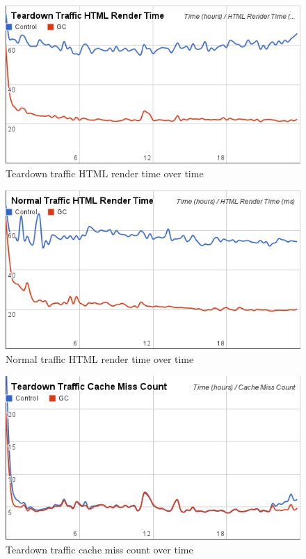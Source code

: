 \documentclass[12pt]{ucthesis}
\begin{document}
\begin{figure}[htp]
\centering
\includegraphics[width=\textwidth]{assets/teardownHTMLRenderTimeXTime.png}
\caption{Teardown traffic HTML render time over time}
\label{fig:teardownHTMLRenderTimeXTime}
\end{figure}

\begin{figure}[htp]
\centering
\includegraphics[width=\textwidth]{assets/normalHTMLRenderTimeXTime.png}
\caption{Normal traffic HTML render time over time}
\label{fig:normalHTMLRenderTimeXTime}
\end{figure}


\begin{figure}[htp]
\centering
\includegraphics[width=\textwidth]{assets/teardownMissCountXTime.png}
\caption{Teardown traffic cache miss count over time}
\label{fig:teardownMissCountXTime}
\end{figure}
\end{document}

